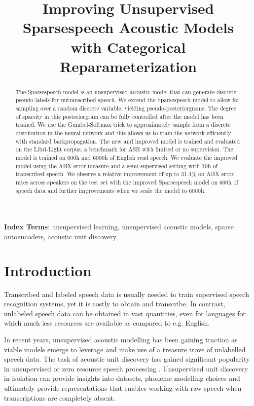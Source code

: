 \documentclass[a4paper]{article}
\title{Improving Unsupervised Sparsespeech Acoustic Models \\ with Categorical Reparameterization}
\begin{document}
\maketitle
\begin{abstract}

The Sparsespeech model is an unsupervised acoustic model that can generate discrete pseudo-labels for untranscribed speech. We extend the Sparsespeech model to allow for sampling over a random discrete variable, yielding pseudo-posteriorgrams. The degree of sparsity in this posteriorgram can be fully controlled after the model has been trained. We use the Gumbel-Softmax trick to approximately sample from a discrete distribution in the neural network and this allows us to train the network efficiently with standard backpropagation. The new and improved model is trained and evaluated on the Libri-Light corpus, a benchmark for ASR with limited or no supervision. The model is trained on 600h and 6000h of English read speech. We evaluate the improved model using the ABX error measure and a semi-supervised setting with 10h of transcribed speech. We observe a relative improvement of up to 31.4\% on ABX error rates across speakers on the test set with the improved Sparsespeech model on 600h of speech data and further improvements when we scale the model to 6000h.



\end{abstract}

\noindent\textbf{Index Terms}: unsupervised learning, unsupervised acoustic models, sparse autoencoders, acoustic unit discovery

\section{Introduction}

Transcribed and labeled speech data is usually needed to train supervised speech recognition systems, yet it is costly to obtain and transcribe. In contrast, unlabeled speech data can be obtained in vast quantities, even for languages for which much less resources are available as compared to e.g. English.

In recent years, unsupervised acoustic modelling has been gaining traction as viable models emerge to leverage and make use of a treasure trove of unlabelled speech data. The task of acoustic unit discovery has gained significant popularity in unsupervised or zero resource speech processing \cite{dunbar2017zero}. Unsupervised unit discovery in isolation can provide insights into datasets, phoneme modelling choices and ultimately provide representations that enables working with raw speech when transcriptions are completely absent.  
\end{document}
